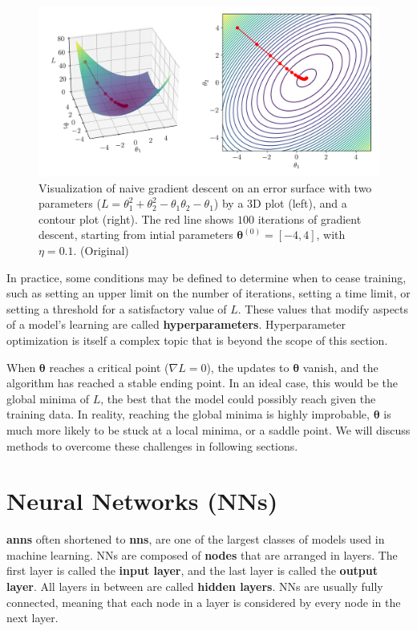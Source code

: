 \documentclass[12pt]{report}
\theoremstyle{definition}
\theoremstyle{remark}
\begin{document}
\begin{figure}[h]
    \centering
    \includegraphics[width=\linewidth]{figs/gradient_descent.png}
    \caption{Visualization of naive gradient descent on an error surface with two parameters ($L = \theta_1^2 + \theta_2^2 - \theta_1\theta_2 - \theta_1$) by a 3D plot (left), and a contour plot (right). The red line shows $100$ iterations of gradient descent, starting from intial parameters $\boldsymbol{\theta}^{(0)} = [-4,4]$, with $\eta = 0.1$. (Original)}
    \label{fig:enter-label}
\end{figure}

In practice, some conditions may be defined to determine when to cease training, such as setting an upper limit on the number of iterations, setting a time limit, or setting a threshold for a satisfactory value of $L$. These values that modify aspects of a model's learning are called \textbf{\glspl{hyperparameter}}. Hyperparameter optimization is itself a complex topic that is beyond the scope of this section.

When $\boldsymbol{\theta}$ reaches a critical point ($\nabla L = 0$), the updates to $\boldsymbol{\theta}$ vanish, and the algorithm has reached a stable ending point. In an ideal case, this would be the global minima of $L$, the best that the model could possibly reach given the training data. In reality, reaching the global minima is highly improbable, $\boldsymbol{\theta}$ is much more likely to be stuck at a local minima, or a saddle point. We will discuss methods to overcome these challenges in following sections.

\section{Neural Networks (NNs)}

\textbf{\Glspl{ann}} often shortened to \textbf{\glspl{nn}}, are one of the largest classes of models used in machine learning. NNs are composed of \textbf{\glspl{node}} that are arranged in layers. The first layer is called the \textbf{input layer}, and the last layer is called the \textbf{output layer}. All layers in between are called \textbf{hidden layers}. NNs are usually fully connected, meaning that each node in a layer is considered by every node in the next layer.
\end{document}
